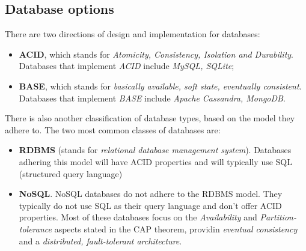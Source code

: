 \documentclass[a4paper,onecolumn,oneside,titlepage,12pt]{report}
\begin{document}
	\subsection{Database options}
	There are two directions of design and implementation for databases:
	\begin{itemize}
		\item \textbf{ACID}, which stands for \emph{Atomicity, Consistency, Isolation and Durability}. Databases that implement \emph{ACID} include \emph{MySQL, SQLite};
		\item \textbf{BASE}, which stands for \emph{basically available, soft state, eventually consistent}. Databases that implement \emph{BASE} include \emph{Apache Cassandra, MongoDB}.
	\end{itemize}
	There is also another classification of database types, based on the model they adhere to. The two most common classes of databases are:
	\begin{itemize}
		\item \textbf{RDBMS} (stands for \emph{relational database management system}). Databases adhering this model will have ACID properties and will typically use SQL (structured query language)
		\item \textbf{NoSQL}. NoSQL databases do not adhere to the RDBMS model. They typically do not use SQL as their query language and don't offer ACID properties. Most of these databases focus on the \emph{Availability} and \emph{Partition-tolerance} aspects stated in the CAP theorem, providin \emph{eventual consistency} and a \emph{distributed, fault-tolerant architecture}.
	\end{itemize}
\end{document}
